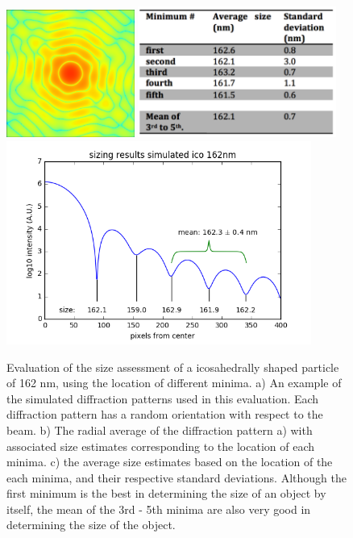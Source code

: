 \begin{figure}[h]
\centering
\includegraphics[width=42mm]{Chapter_08_ImageClassification_Simulated_Icosahedron.png}
\includegraphics[width=65mm]{Chapter_08_ImageClassification_Stats.png}
\includegraphics[width=100mm]{Chapter_08_ImageClassification_Sizing_Results.png}

\caption{Evaluation of the size assessment of a icosahedrally shaped particle of 162 nm, using the location of different minima. a) An example of the simulated diffraction patterns used in this evaluation. Each diffraction pattern has a random orientation with respect to the beam. b) The radial average of the diffraction pattern a) with associated size estimates corresponding to the location of each minima. c) the average size estimates based on the location of the each minima, and their respective standard deviations. Although the first minimum is the best in determining the size of an object by itself, the mean of the 3rd - 5th minima are also very good in determining the size of the object.}\label{fig:shape_assessment}
\end{figure}



